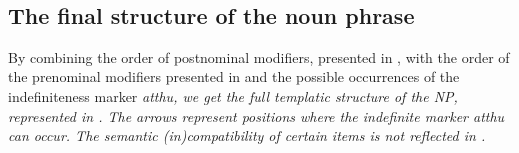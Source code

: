 \\


\subsection{The final structure of the noun phrase}\label{sec:nppp:Thefinalstructureofthenounphrase}

By combining the order of postnominal modifiers, presented in   , with the order of the prenominal modifiers presented in  and the possible occurrences of the indefiniteness marker \em atthu\em, we get the full templatic structure of the NP, represented in  . The arrows represent positions where the indefinite marker \em atthu \em can occur. The semantic (in)compatibility of certain items is not reflected in .


